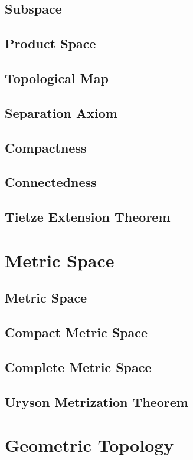 \documentclass[twoside,openright]{report}
\begin{document}
\section{Subspace}
\section{Product Space}
\section{Topological Map}
\section{Separation Axiom}
\section{Compactness}
\section{Connectedness}
\section{Tietze Extension Theorem}

\chapter{Metric Space}

\section{Metric Space}

\section{Compact Metric Space}

\section{Complete Metric Space}

\section{Uryson Metrization Theorem}



\chapter{Geometric Topology}
\end{document}
